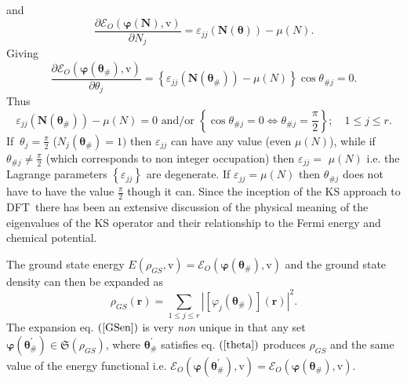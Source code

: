 \documentclass[aps,preprint]{revtex4}%
\begin{document}
and
\begin{equation}
\frac{\partial\mathcal{E}_{O}\left(  \boldsymbol{\varphi}\left(
\boldsymbol{N}\right)  \boldsymbol{,}\mathrm{v}\right)  }{\partial N_{j}%
}=\varepsilon_{jj}\left(  \boldsymbol{N}\left(  \boldsymbol{\theta}\right)
\right)  -\mu\left(  N\right)  .
\end{equation}
Giving
\begin{equation}
\frac{\partial\mathcal{E}_{O}\left(  \boldsymbol{\varphi}\left(
\boldsymbol{\theta}_{\#}\right)  \boldsymbol{,}\mathrm{v}\right)  }%
{\partial\theta_{j}}=\left\{  \varepsilon_{jj}\left(  \boldsymbol{N}\left(
\boldsymbol{\theta}_{\#}\right)  \right)  -\mu\left(  N\right)  \right\}
\cos\theta_{\#j}=0. \label{theta}%
\end{equation}
Thus
\begin{equation}
\varepsilon_{jj}\left(  \boldsymbol{N}\left(  \boldsymbol{\theta}_{\#}\right)
\right)  -\mu\left(  N\right)  =0\text{ and/or }\left\{  \cos\theta
_{\#j}=0\Leftrightarrow\theta_{\#j}=\frac{\pi}{2}\right\}  ;\quad1\leq j\leq
r. \label{Con1}%
\end{equation}
If $\ \theta_{j}=\frac{\pi}{2}$ ($N_{j}\left(  \boldsymbol{\theta}%
_{\#}\right)  =1)$ then $\varepsilon_{jj}$ can have any value (even
$\mu\left(  N\right)  $), while if $\theta_{\#j}\neq\frac{\pi}{2}$ (which
corresponds to non integer occupation) then $\varepsilon_{jj}=$ $\mu\left(
N\right)  $ i.e. the Lagrange parameters $\left\{  \varepsilon_{jj}\right\}  $
are degenerate. If $\varepsilon_{jj}=\mu\left(  N\right)  $ then $\theta
_{\#j}$ does not have to have the value $\frac{\pi}{2}$ though it can. Since
the inception of the KS approach to DFT\ there has been an extensive
discussion of the physical meaning of the eigenvalues of the KS operator and
their relationship to the Fermi energy and chemical potential.

The ground state energy $E\left(  \rho_{GS}\boldsymbol{,}\mathrm{v}\right)
=\mathcal{E}_{O}\left(  \boldsymbol{\varphi}\left(  \boldsymbol{\theta}%
_{\#}\right)  ,\mathrm{v}\right)  $ and the ground state density can then be
expanded as
\begin{equation}
\rho_{GS}\left(  \boldsymbol{r}\right)  =\sum_{1\leq j\leq r}\left\vert
\left[  \varphi_{j}\left(  \boldsymbol{\theta}_{\#}\right)  \right]  \left(
\boldsymbol{r}\right)  \right\vert ^{2}. \label{GSen}%
\end{equation}
The expansion eq. $\left(  \ref{GSen}\right)  $ is very \emph{non} unique in
that any set $\boldsymbol{\varphi}\left(  \boldsymbol{\theta}_{\#}^{\prime
}\right)  \in\mathfrak{S}\left(  \rho_{GS}\right)  $, where
$\boldsymbol{\theta}_{\#}^{\prime}$ satisfies eq. $\left(  \ref{theta}\right)
$ produces $\rho_{GS}$ and the same value of the energy functional i.e.
$\mathcal{E}_{O}\left(  \boldsymbol{\varphi}\left(  \boldsymbol{\theta}%
_{\#}^{\prime}\right)  ,\mathrm{v}\right)  =\mathcal{E}_{O}\left(
\boldsymbol{\varphi}\left(  \boldsymbol{\theta}_{\#}\right)  ,\mathrm{v}%
\right)  $.
\end{document}
